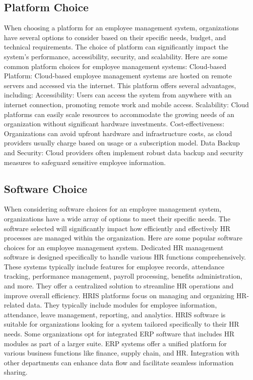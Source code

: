 \subsection{Platform Choice}
When choosing a platform for an employee management system, organizations have several
options to consider based on their specific needs, budget, and technical requirements. The
choice of platform can significantly impact the system's performance, accessibility, security,
and scalability. Here are some common platform choices for employee management systems:
Cloud-based Platform: Cloud-based employee management systems are hosted on remote
servers and accessed via the internet. This platform offers several advantages, including:
Accessibility: Users can access the system from anywhere with an internet connection,
promoting remote work and mobile access.
Scalability: Cloud platforms can easily scale resources to accommodate the growing needs of
an organization without significant hardware investments.
Cost-effectiveness: Organizations can avoid upfront hardware and infrastructure costs, as
cloud providers usually charge based on usage or a subscription model.
Data Backup and Security: Cloud providers often implement robust data backup and security
measures to safeguard sensitive employee information.
\subsection{Software Choice}
When considering software choices for an employee management system,
organizations have a wide array of options to meet their specific needs. The software
selected will significantly impact how efficiently and effectively HR processes are
managed within the organization. Here are some popular software choices for an
employee management system. Dedicated HR management software is designed
specifically to handle various HR functions comprehensively. These systems typically
include features for employee records, attendance tracking, performance management,
payroll processing, benefits administration, and more. They offer a centralized solution
to streamline HR operations and improve overall efficiency. HRIS platforms focus on
managing and organizing HR-related data. They typically include modules for employee
information, attendance, leave management, reporting, and analytics. HRIS software is
suitable for organizations looking for a system tailored specifically to their HR needs.
Some organizations opt for integrated ERP software that includes HR modules as part of
a larger suite. ERP systems offer a unified platform for various business functions like
finance, supply chain, and HR. Integration with other departments can enhance data flow
and facilitate seamless information sharing.
\newpage
